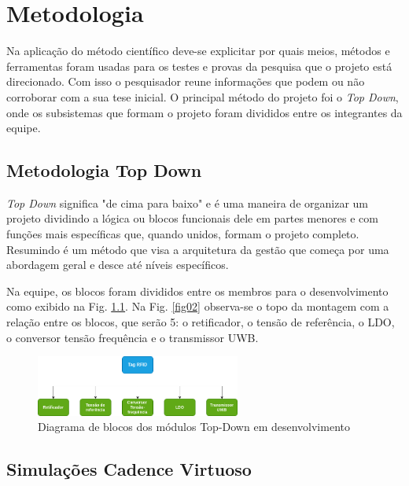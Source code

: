 
\chapter[Metodologia]{Metodologia}

Na aplicação do método científico deve-se explicitar por quais meios, métodos e ferramentas foram usadas para os testes e provas da pesquisa que o projeto está direcionado. Com isso o pesquisador reune informações que podem ou não corroborar com a sua tese inicial. O principal método do projeto foi o \textit{Top Down}, onde os subsistemas que formam o projeto foram divididos entre os integrantes da equipe.

\section{Metodologia Top Down}

\textit{Top Down} significa "de cima para baixo" e é uma maneira de organizar um projeto dividindo a lógica ou blocos funcionais dele em partes menores e com funções mais específicas que, quando unidos, formam o projeto completo. Resumindo é um método que visa a arquitetura da gestão que começa por uma abordagem geral e desce até níveis específicos.\cite{site_top_down}

Na equipe, os blocos foram divididos entre os membros para o  desenvolvimento como exibido na Fig. \ref{fig03}. Na Fig. \ref{fig02} observa-se o topo da montagem com a relação entre os blocos, que serão 5: o retificador, o tensão de referência, o LDO, o conversor tensão frequência e o transmissor UWB.

\begin{figure}[htb]
	\centering
	\includegraphics[width=0.6\textwidth]{figuras/diagrama.png}
	\caption{Diagrama de blocos dos módulos Top-Down em desenvolvimento}
	\label{fig03}
\end{figure}






\section{Simulações Cadence Virtuoso }


